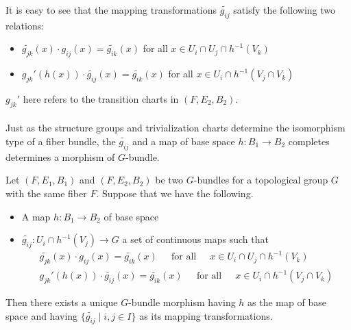 \documentclass[a4paper]{article}
\begin{document}
It is easy to see that the mapping transformations $\widetilde{g_{ij}}$ satisfy the following two relations: 
\begin{itemize}
\item $\widetilde{g_{jk}}(x)\cdot g_{ij}(x)=\widetilde{g_{ik}}(x)$ for all $x\in U_i\cap U_j\cap h^{-1}(V_k)$
\item $g_{jk}'(h(x))\cdot\widetilde{g_{ij}}(x)=\widetilde{g_{ik}}(x)$ for all $x\in U_i\cap h^{-1}(V_j\cap V_k)$
\end{itemize}

$g_{jk}'$ here refers to the transition charts in $(F,E_2,B_2)$. \\~\\

Just as the structure groups and trivialization charts determine the isomorphism type of a fiber bundle, the $\widetilde{g_{ij}}$ and a map of base space $h:B_1\to B_2$ completes determines a morphism of $G$-bundle. 

\begin{lmm}{}{} Let $(F,E_1,B_1)$ and $(F,E_2,B_2)$ be two $G$-bundles for a topological group $G$ with the same fiber $F$. Suppose that we have the following. 
\begin{itemize}
\item A map $h:B_1\to B_2$ of base space
\item $\widetilde{g_{ij}}:U_i\cap h^{-1}(V_j)\to G$ a set of continuous maps such that \begin{gather*}
\widetilde{g_{jk}}(x)\cdot g_{ij}(x)=\widetilde{g_{ik}}(x)\;\;\;\;\text{ for all }\;\;\;\;x\in U_i\cap U_j\cap h^{-1}(V_k)\\
g_{jk}'(h(x))\cdot\widetilde{g_{ij}}(x)=\widetilde{g_{ik}}(x)\;\;\;\;\text{ for all }\;\;\;\;x\in U_i\cap h^{-1}(V_j\cap V_k)
\end{gather*}
\end{itemize}
Then there exists a unique $G$-bundle morphism having $h$ as the map of base space and having $\{\widetilde{g_{ij}}\;|\;i,j\in I\}$ as its mapping transformations. 
\end{lmm}
\end{document}
